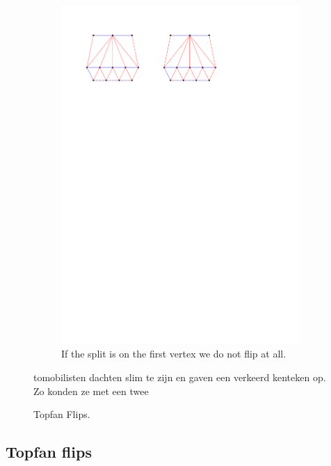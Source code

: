 \begin{figure}[!b]
\begin{subfigure}[b]{0.45 \textwidth}
        \includegraphics[width =\textwidth]{topFanFlips/img/splitfront}
        \caption{If the split is on the first vertex we do not flip at all.}
        \label{fig:fanflip:splitFirstVertex}
    \end{subfigure}

    \caption{Topfan Flips.}
    \label{fig:fanflip:fanflips}tomobilisten dachten slim te zijn en gaven een verkeerd kenteken op. Zo konden ze met een twee
\end{figure}

\subsection{Topfan flips}
\thispagestyle{plain}
\label{ss:fanflip}

